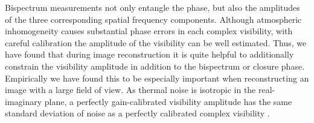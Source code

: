 



Bispectrum measurements not only entangle the phase, but also the amplitudes of the three corresponding spatial frequency components. 
Although atmospheric inhomogeneity causes substantial phase errors in each complex visibility, with careful calibration the amplitude of the visibility can be well estimated. Thus, we have found that during image reconstruction it is quite helpful to additionally constrain the visibility amplitude in addition to the bispectrum or closure phase. Empirically we have found this to be especially important when reconstructing an image with a large field of view. 
As thermal noise is isotropic in the real-imaginary plane, a perfectly gain-calibrated visibility amplitude has the same standard deviation of noise as a perfectly calibrated complex visibility \cite{TMS}. 



